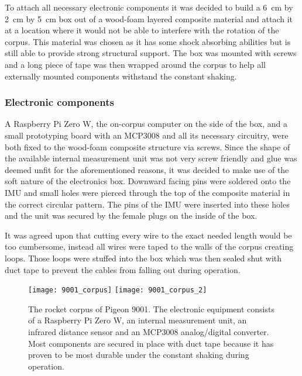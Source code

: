 To attach all necessary electronic components it was decided to build a \SI{6}{\centi\meter} by \SI{2}{\centi\meter} by \SI{5}{\centi\meter} box out of a wood-foam layered composite material and attach it at a location where it would not be able to interfere with the rotation of the corpus. This material was chosen as it has some shock absorbing abilities but is still able to provide strong structural support. The box was mounted with screws and a long piece of tape was then wrapped around the corpus to help all externally mounted components withstand the constant shaking. 

\subsubsection{Electronic components}

A Raspberry Pi Zero W, the on-corpus computer on the side of the box, and a small prototyping board with an MCP3008 and all its necessary circuitry, were both fixed to the wood-foam composite structure via screws. Since the shape of the available internal measurement unit \cite{imu} was not very screw friendly and glue was deemed unfit for the aforementioned reasons, it was decided to make use of the soft nature of the electronics box. Downward facing pins were soldered onto the IMU and small holes were pierced through the top of the composite material in the correct circular pattern. The pins of the IMU were inserted into these holes and the unit was secured by the female plugs on the inside of the box.

It was agreed upon that cutting every wire to the exact needed length would be too cumbersome, instead all wires were taped to the walls of the corpus creating loops. Those loops were stuffed into the box which was then sealed shut with duct tape to prevent the cables from falling out during operation.

\begin{figure}[H]
\centering

\texttt{[image: 9001\_corpus]}
\texttt{[image: 9001\_corpus\_2]}
\vspace{10pt}
\caption{The rocket corpus of Pigeon 9001. The electronic equipment consists of a Raspberry Pi Zero W, an internal measurement unit, an infrared distance sensor and an MCP3008 analog/digital converter. Most components are secured in place with duct tape because it has proven to be most durable under the constant shaking during operation.}
\end{figure}

